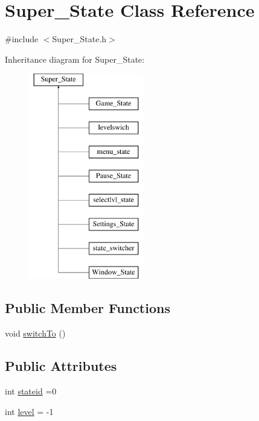 \hypertarget{class_super___state}{}\section{Super\+\_\+\+State Class Reference}
\label{class_super___state}


{\ttfamily \#include $<$Super\+\_\+\+State.\+h$>$}

Inheritance diagram for Super\+\_\+\+State\+:\begin{figure}[H]
\begin{center}
\leavevmode
\includegraphics[height=9.000000cm]{class_super___state}
\end{center}
\end{figure}
\subsection*{Public Member Functions}
\begin{DoxyCompactItemize}
\item 
void \hyperlink{class_super___state_a2f0cf545a5099f59e1c0bf87423ee846}{switch\+To} ()
\end{DoxyCompactItemize}
\subsection*{Public Attributes}
\begin{DoxyCompactItemize}
\item 
int \hyperlink{class_super___state_a5f3b37d247498fd969869834ab7904fa}{stateid} =0
\item 
int \hyperlink{class_super___state_ad6b74d4864a4e2cccf58316cd1af2e83}{level} = -\/1
\end{DoxyCompactItemize}


